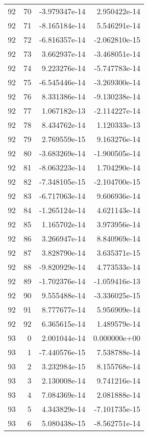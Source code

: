 \begin{tabular}{rrrr}
  92 &   70 & -3.979347e-14 &  2.950422e-14 \\
  92 &   71 & -8.165184e-14 &  5.546291e-14 \\
  92 &   72 & -6.816357e-14 & -2.062810e-15 \\
  92 &   73 &  3.662937e-14 & -3.468051e-14 \\
  92 &   74 &  9.223276e-14 & -5.747783e-14 \\
  92 &   75 & -6.545446e-14 & -3.269300e-14 \\
  92 &   76 &  8.331386e-14 & -9.130238e-14 \\
  92 &   77 &  1.067182e-13 & -2.114227e-14 \\
  92 &   78 &  8.434762e-14 &  1.120333e-13 \\
  92 &   79 &  2.769559e-15 &  9.163276e-14 \\
  92 &   80 & -3.683269e-14 & -1.900505e-14 \\
  92 &   81 & -8.063223e-14 &  1.704290e-14 \\
  92 &   82 & -7.348105e-15 & -2.104700e-15 \\
  92 &   83 & -6.717063e-14 &  9.606936e-14 \\
  92 &   84 & -1.265124e-14 &  4.621143e-14 \\
  92 &   85 &  1.165702e-14 &  3.973956e-14 \\
  92 &   86 &  3.266947e-14 &  8.840969e-14 \\
  92 &   87 &  3.828790e-14 &  3.635371e-15 \\
  92 &   88 & -9.820929e-14 &  4.773533e-14 \\
  92 &   89 & -1.702376e-14 & -1.059416e-13 \\
  92 &   90 &  9.555488e-14 & -3.336025e-15 \\
  92 &   91 &  8.777677e-14 &  5.956909e-14 \\
  92 &   92 &  6.365615e-14 &  1.489579e-14 \\
  93 &    0 &  2.001044e-14 &  0.000000e+00 \\
  93 &    1 & -7.440576e-15 &  7.538788e-14 \\
  93 &    2 &  3.232984e-15 &  8.155768e-14 \\
  93 &    3 &  2.130008e-14 &  9.741216e-14 \\
  93 &    4 &  7.084369e-14 &  2.081888e-14 \\
  93 &    5 &  4.343829e-14 & -7.101735e-15 \\
  93 &    6 &  5.080438e-15 & -8.562751e-14 \\

\end{tabular}
